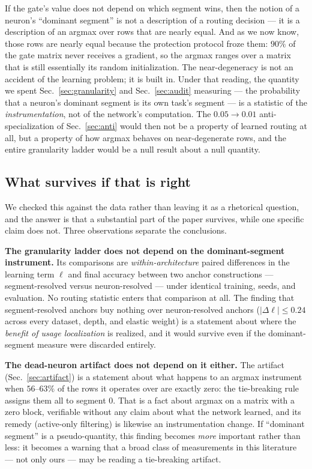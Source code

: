 \documentclass[review,12pt,number]{elsarticle}
\begin{document}
If the gate's value does not depend on which segment wins, then the
notion of a neuron's ``dominant segment'' is not a description of a
routing decision --- it is a description of an argmax over rows that are
nearly equal. And as we now know, those rows are nearly equal because
the protection protocol froze them: $90\%$ of the gate matrix never
receives a gradient, so the argmax ranges over a matrix that is still
essentially its random initialization. The near-degeneracy is not an
accident of the learning problem; it is built in. Under that reading, the quantity we spent
Sec.~\ref{sec:granularity} and Sec.~\ref{sec:audit} measuring --- the
probability that a neuron's dominant segment is its own task's segment ---
is a statistic of the \emph{instrumentation}, not of the network's
computation. The $0.05\to 0.01$ anti-specialization of
Sec.~\ref{sec:anti} would then not be a property of learned routing at
all, but a property of how argmax behaves on near-degenerate rows, and
the entire granularity ladder would be a null result about a null
quantity.

\subsection{What survives if that is right}

We checked this against the data rather than leaving it as a rhetorical
question, and the answer is that a substantial part of the paper survives,
while one specific claim does not. Three observations separate the
conclusions.

\textbf{The granularity ladder does not depend on the dominant-segment
instrument.} Its comparisons are \emph{within-architecture} paired
differences in the learning term $\ell$ and final accuracy between two
anchor constructions --- segment-resolved versus neuron-resolved --- under
identical training, seeds, and evaluation. No routing statistic enters
that comparison at all. The finding that segment-resolved anchors buy
nothing over neuron-resolved anchors ($|\Delta\ell|\le 0.24$ across every
dataset, depth, and elastic weight) is a statement about where the
\emph{benefit of usage localization} is realized, and it would survive
even if the dominant-segment measure were discarded entirely.

\textbf{The dead-neuron artifact does not depend on it either.} The
artifact (Sec.~\ref{sec:artifact}) is a statement about what happens to
an argmax instrument when $56$--$63\%$ of the rows it operates over are
exactly zero: the tie-breaking rule assigns them all to segment $0$.
That is a fact about argmax on a matrix with a zero block, verifiable
without any claim about what the network learned, and its remedy
(active-only filtering) is likewise an instrumentation change. If
``dominant segment'' is a pseudo-quantity, this finding becomes
\emph{more} important rather than less: it becomes a warning that a
broad class of measurements in this literature --- not only ours --- may be
reading a tie-breaking artifact.
\end{document}
